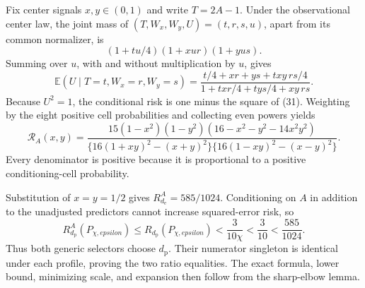 Fix center signals \(x,y\in(0,1)\) and write \(T=2A-1\). Under the observational center law, the joint mass of \((T,W_x,W_y,U)=(t,r,s,u)\), apart from its common normalizer, is
\[
 (1+tu/4)(1+xur)(1+yus).                                   \tag{30}
\]
Summing over \(u\), with and without multiplication by \(u\), gives
\[
 \mathbb E(U\mid T=t,W_x=r,W_y=s)
 =\frac{t/4+xr+ys+txy\,rs/4}
 {1+txr/4+tys/4+xy\,rs}.                                  \tag{31}
\]
Because \(U^2=1\), the conditional risk is one minus the square of (31). Weighting by the eight positive cell probabilities and collecting even powers yields
\[
 \mathcal R_A(x,y)=
 \frac{15(1-x^2)(1-y^2)(16-x^2-y^2-14x^2y^2)}
 {\{16(1+xy)^2-(x+y)^2\}\{16(1-xy)^2-(x-y)^2\}}.         \tag{32}
\]
Every denominator is positive because it is proportional to a positive conditioning-cell probability.

Substitution of \(x=y=1/2\) gives \(R_{d_{\mathrm e}}^A=585/1024\). Conditioning on \(A\) in addition to the unadjusted predictors cannot increase squared-error risk, so
\[
 R_{d_{\mathrm p}}^A(P_{\chi,epsilon})
 \le R_{d_{\mathrm p}}(P_{\chi,epsilon})
 <\frac3{10\chi}<\frac3{10}<\frac{585}{1024}.
\]
Thus both generic selectors choose \(d_{\mathrm p}\). Their numerator singleton is identical under each profile, proving the two ratio equalities. The exact formula, lower bound, minimizing scale, and expansion then follow from the sharp-elbow lemma.